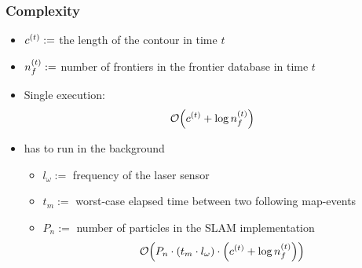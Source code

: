 \begin{frame}
\label{frame:ffd_complexity}
\frametitle{\FFD Complexity}
\begin{itemize}
  \item $c^{\left(t\right)}:=$ the length of the contour in time $t$
  \item $n_f^{\left(t\right)}:=$ number of frontiers in the frontier database in time
  $t$
  \item Single execution:
   $$\mathcal{O}{\left(c^{\left(t\right)} +
        \log{n_f^{\left(t\right)}}\right)}  
   $$
  \item \FFD has to run in the background  
  \begin{itemize}
    \item $l_\omega:=$ frequency of the laser sensor
    \item $t_{m}:=$ worst-case elapsed time between two following map-events
    \item $P_n:=$ number of particles in the SLAM implementation
    $$
    \mathcal{O}{\left(P_n\cdot {\left(t_m \cdot l_\omega\right)} \cdot{\left(c^{\left(t\right)} +
        \log{n_f^{\left(t\right)}}\right)}\right)} 
    $$
  \end{itemize}
\end{itemize}
\hyperlink{frame:ffd_complexity_details}{}
\end{frame}